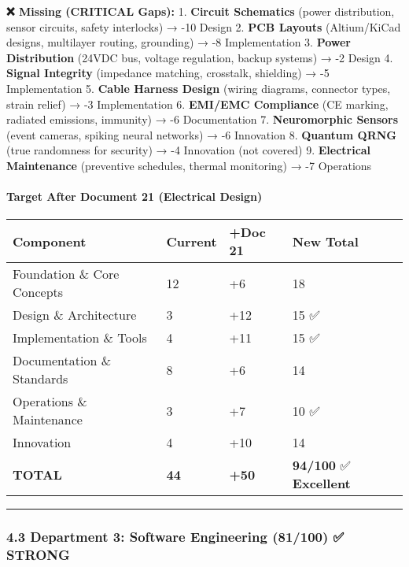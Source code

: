 \documentclass[
]{article}
\begin{document}
\textbf{❌ Missing (CRITICAL Gaps):} 1. \textbf{Circuit Schematics}
(power distribution, sensor circuits, safety interlocks) → -10 Design 2.
\textbf{PCB Layouts} (Altium/KiCad designs, multilayer routing,
grounding) → -8 Implementation 3. \textbf{Power Distribution} (24VDC
bus, voltage regulation, backup systems) → -2 Design 4. \textbf{Signal
Integrity} (impedance matching, crosstalk, shielding) → -5
Implementation 5. \textbf{Cable Harness Design} (wiring diagrams,
connector types, strain relief) → -3 Implementation 6. \textbf{EMI/EMC
Compliance} (CE marking, radiated emissions, immunity) → -6
Documentation 7. \textbf{Neuromorphic Sensors} (event cameras, spiking
neural networks) → -6 Innovation 8. \textbf{Quantum QRNG} (true
randomness for security) → -4 Innovation (not covered) 9.
\textbf{Electrical Maintenance} (preventive schedules, thermal
monitoring) → -7 Operations

\hypertarget{target-after-document-21-electrical-design}{%
\paragraph{Target After Document 21 (Electrical
Design)}\label{target-after-document-21-electrical-design}}

\begin{longtable}[]{@{}llll@{}}
\toprule\noalign{}
Component & Current & +Doc 21 & New Total \\
\midrule\noalign{}
\endhead
\bottomrule\noalign{}
\endlastfoot
Foundation \& Core Concepts & 12 & +6 & 18 \\
Design \& Architecture & 3 & +12 & 15 ✅ \\
Implementation \& Tools & 4 & +11 & 15 ✅ \\
Documentation \& Standards & 8 & +6 & 14 \\
Operations \& Maintenance & 3 & +7 & 10 ✅ \\
Innovation & 4 & +10 & 14 \\
\textbf{TOTAL} & \textbf{44} & \textbf{+50} & \textbf{94/100} ✅
\textbf{Excellent} \\
\end{longtable}

\begin{center}\rule{0.5\linewidth}{0.5pt}\end{center}

\hypertarget{department-3-software-engineering-81100-strong}{%
\subsubsection{4.3 Department 3: Software Engineering (81/100) ✅
STRONG}\label{department-3-software-engineering-81100-strong}}
\end{document}
